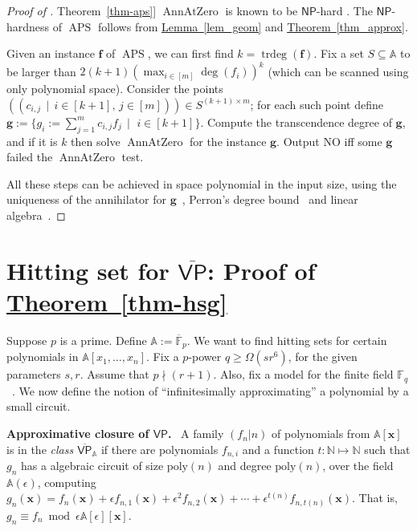 \documentclass[11pt]{article}
\numberwithin{equation}{section}
\theoremstyle{definition}
\theoremstyle{plain}
\newcommand{\cclass}[1]{\textsf{#1}}
\newcommand{\expref}[2]{\hyperref[#2]{#1~\ref{#2}}}
\newcommand{\F}{\mathbb{F}}
\newcommand{\aff}{\mathbb{A}}
\DeclareMathOperator{\trdeg}{\mathrm{trdeg}}
\newcommand{\ol}[1]{\overline{#1}}
\newcommand{\NP}{\cclass{NP}\xspace}  %
\newcommand{\VP}{\cclass{VP}\xspace}  %
\newcommand{\VPbar}{\overline{\VP}\xspace}  %
\DeclareMathOperator{\APS}{\mathrm{APS}\xspace} %
\DeclareMathOperator{\AnnAtZero}{\mathrm{AnnAtZero}\xspace} %
\begin{document}
%
%
\begin{proof}[Proof of \expref{Theorem}{thm-aps}]
$\AnnAtZero$ is known to be $\NP$-hard \cite{Kay09}. The $\NP$-hardness of $\APS$ follows from \expref{Lemma}{lem_geom} and \expref{Theorem}{thm_approx}.

Given an instance $\mathbf f$ of $\APS$, we can first find $k=\trdeg(\mathbf f)$. Fix a 
%
set %
$S\subseteq \aff$ to be larger than $2(k+1)(\max_{i\in [m]}\deg(f_i))^k$ (which can be scanned using only 
%
polynomial space). %
Consider the points $\left(\left(c_{i,j} \,\mid\, i\in [k+1],\, j\in [m] \right)\right)\in S^{(k+1)\times m}$; for each such point define $\mathbf g:= \big\{g_i:= \sum_{j=1}^m c_{i,j} f_j \,\mid$ $i\in[k+1] \big\}$.   
Compute the transcendence degree of $\mathbf g$, and if it is $k$ then solve $\AnnAtZero$ for the instance $\mathbf g$. 
Output NO iff some $\mathbf g$ failed the $\AnnAtZero$ test.

All these steps can be achieved in space polynomial in the input size, using the uniqueness of the annihilator for $\mathbf g$~\cite[Theorem~47]{Mat80}, Perron's degree bound~\cite{Plo05} and linear algebra~\cite{C76, BGH82, Mul87}.
\end{proof}
%
%

\section{Hitting set for \texorpdfstring{$\VPbar$}{VPbar}: Proof of \expref{Theorem}{thm-hsg}} \label{sec-hsg}

Suppose $p$ is a prime. Define $\aff:=\ol{\F}_p$. We want to find hitting sets for certain polynomials in $\aff[x_1,\dots,x_n]$. Fix a $p$-power $q\ge\Omega(sr^6)$, for the given parameters $s, r$. Assume that $p\nmid(r+1)$. Also, fix a model for the finite field $\F_q$~\cite{AL86}. We now define the notion of ``infinitesimally approximating'' a polynomial by a small circuit.

\smallskip\noindent
%
%
\textbf{Approximative closure of $\VP$.}~\cite{bringmann2017algebraic}
A family $(f_n|n)$ of polynomials from $\aff[\mathbf x]$ is in the \emph{class
%
%
$\VPbar_\aff$}       %
if there are polynomials $f_{n,i}$ and a function $t:\mathbb{N} \mapsto \mathbb{N}$ such that $g_n$  has a 
%
algebraic circuit of  size $\mathrm{poly}(n)$ and  degree $\mathrm{poly}(n)$, %
over the field $\aff(\epsilon)$, computing $g_n(\mathbf x)= f_n(\mathbf x)+ \epsilon f_{n,1}(\mathbf x)+ {\epsilon}^2 f_{n,2}(\mathbf x)+ \cdots+ {\epsilon}^{t(n)} f_{n,t(n)}(\mathbf x)$. That is, $g_n \equiv f_n \bmod{\epsilon\aff[\epsilon][\mathbf x]}$.
  
\end{document}
